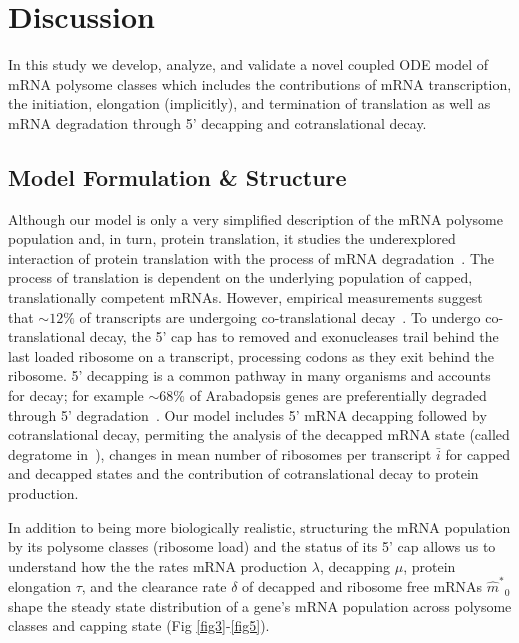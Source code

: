 \documentclass[10pt,letterpaper]{article}
\newcommand{\mhat}{\ensuremath{\hat{m}}\xspace}
\newcommand{\mhatstar}{\ensuremath{\mhat^{*}}\xspace}
\newcommand{\MRL}{\ensuremath{\bar{i}}\xspace}
\begin{document}
\section*{Discussion}

In this study we develop, analyze, and validate a novel coupled ODE model of mRNA polysome classes %
which includes the contributions of mRNA transcription, the initiation, elongation (implicitly), and termination of translation as well as mRNA degradation through 5' decapping and cotranslational decay.

\subsection*{Model Formulation \& Structure}

Although our model is only a very simplified description of the mRNA polysome population and, in turn, protein translation, it studies the underexplored interaction of protein translation with the process of mRNA degradation~\cite{RN11}. The process of translation is dependent on the underlying population of capped, translationally competent mRNAs. However, empirical measurements suggest that $\sim 12\%$ of transcripts are undergoing co-translational decay~\cite{RN4}. To undergo co-translational decay, the 5' cap has to removed and exonucleases trail behind the last loaded ribosome on a transcript, processing codons as they exit behind the ribosome. 5' decapping is a common pathway in many organisms and accounts for decay; for example $\sim 68\%$ of Arabadopsis genes are preferentially degraded through 5' degradation~\cite{RN28}.
Our model includes 5' mRNA decapping followed by cotranslational decay, permiting the analysis of the decapped mRNA state (called degratome in~\cite{RN34}), changes in mean number of ribosomes per transcript \MRL for capped and decapped states and the contribution of cotranslational decay to protein production.

In addition to being more biologically realistic, structuring the mRNA population by its polysome classes (ribosome load) and the status of its 5' cap allows us to understand how the the rates mRNA production $\lambda$, decapping $\mu$, protein elongation $\tau$, and the clearance rate $\delta$ of decapped and ribosome free mRNAs $\mhatstar_0$ shape the steady state distribution of a gene's mRNA population across polysome classes and capping state (Fig \ref{fig3}-\ref{fig5}).
\end{document}

